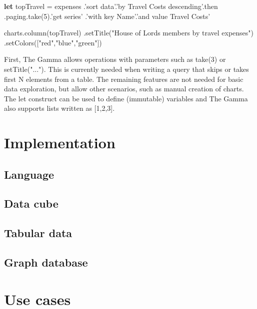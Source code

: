 \documentclass{sigchi}
\newcommand{\kvd}[1]{\textbf{#1}}
\newcommand{\ikvd}[1]{{\fontfamily{zi4}\selectfont\small #1}}
\begin{document}
\begin{thegamma}
\kvd{let} topTravel =
  expenses
    .'sort data'.'by Travel Costs descending'.then
    .paging.take(5).'get series'
    .'with key Name'.'and value Travel Costs'

charts.column(topTravel)
  .setTitle("House of Lords members by travel expenses")
  .setColors(["red","blue","green"])
\end{thegamma}

First, The Gamma allows operations with parameters such as \ikvd{take(3)} or \ikvd{setTitle("...")}.
This is currently needed when writing a query that skips or takes first N elements from a table.
The remaining features are not needed for basic data exploration, but allow other scenarios, such
as manual creation of charts. The \ikvd{let} construct can be used to define (immutable) variables
and The Gamma also supports lists written as \ikvd{[1,2,3]}.


\section{Implementation}
\label{sec:implementation}

\subsection{Language}

\subsection{Data cube}

\subsection{Tabular data}

\subsection{Graph database}


\section{Use cases}
\label{sec:cases}
\end{document}
